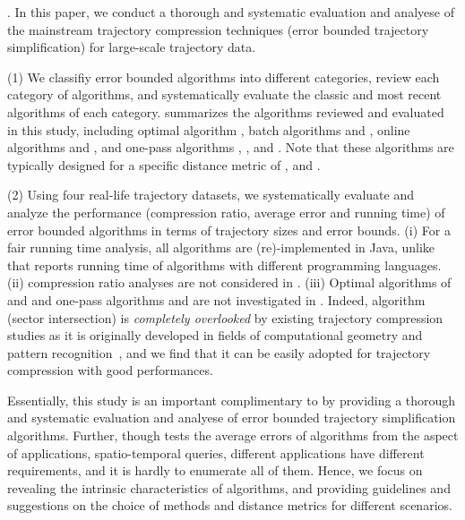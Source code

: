 




.
In this paper, we conduct a thorough and systematic evaluation and analyese of the mainstream trajectory compression techniques (\ie  error bounded trajectory simplification) for large-scale trajectory data.

\sstab (1) We classifiy error bounded \lsa algorithms into different categories, review each category of algorithms, and systematically evaluate the classic and most recent algorithms of each category.
%
 summarizes the algorithms reviewed and evaluated in this study, including 
optimal algorithm \opt,
batch algorithms \douglas and \pavlidis, 
online algorithms \bqsa and \squishe,  and
one-pass algorithms \operb, \siped, \cised and \interval. Note that these algorithms are typically designed for a specific distance metric of \ped, \sed and \dad.

\sstab (2) Using four real-life trajectory datasets, we systematically evaluate and analyze the performance (compression ratio, average error and running
time) of error bounded \lsa algorithms in terms of trajectory sizes and error bounds.   
%
(i) For a fair running time analysis, all algorithms are (re)-implemented in Java, unlike \cite{Zhang:Evaluation} that reports running time of algorithms with different programming languages. (ii) compression ratio analyses are not considered in \cite{Zhang:Evaluation}. (iii) Optimal algorithms of \ped and \sed and one-pass algorithms \siped and \cised are not investigated in \cite{Zhang:Evaluation}. Indeed, algorithm \siped (sector intersection) is {\em completely overlooked} by existing trajectory compression studies as it is originally developed in fields of computational geometry and pattern recognition~\cite{Williams:Longest,Sklansky:Cone,Dunham:Cone, Zhao:Sleeve}, and we find that it can be easily adopted for trajectory compression with good performances.


 Essentially, this study is an important complimentary to \cite{Zhang:Evaluation} by  providing a thorough and systematic evaluation and analyese of error bounded trajectory simplification algorithms. Further, though  \cite{Zhang:Evaluation}  tests the average errors of algorithms from the aspect
of applications, \ie spatio-temporal queries,  different applications have different requirements, and it is hardly to enumerate all of them.  Hence, we focus on revealing the intrinsic characteristics of algorithms, and providing guidelines and suggestions on the choice of methods and distance metrics for different scenarios.
 
